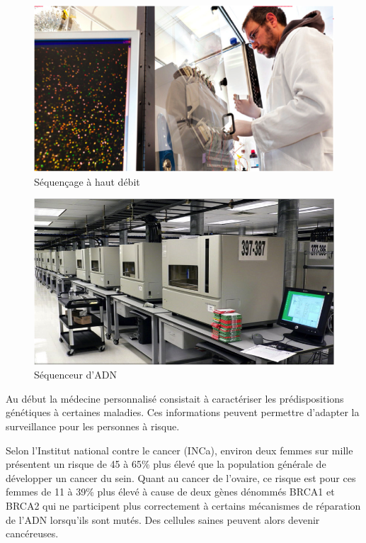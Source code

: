 \documentclass[12pt, openany]{report}
\begin{document}
\begin{figure}[H]
\begin{center}
    \includegraphics[scale=1]{Images/im10.png}
\caption{Séquençage à haut débit}
\end{center}
\end{figure}

\begin{figure}[H]
\begin{center}
    \includegraphics[scale=1]{Images/im11.png}
\caption{Séquenceur d’ADN}
\end{center}
\end{figure}
	
Au début la médecine personnalisé consistait à caractériser les prédispositions génétiques à certaines maladies. Ces informations peuvent permettre d’adapter la surveillance pour les personnes à risque. 
	
	Selon l’Institut national contre le cancer (INCa), environ deux femmes sur mille présentent un risque de 45 à 65\% plus élevé que la population générale de développer un cancer du sein. Quant au cancer de l’ovaire, ce risque est pour ces femmes de 11 à 39\% plus élevé à cause de  deux gènes dénommés BRCA1 et BRCA2 qui ne participent plus correctement à certains mécanismes de réparation de l’ADN lorsqu'ils sont mutés. Des cellules saines peuvent alors devenir cancéreuses.
\end{document}
